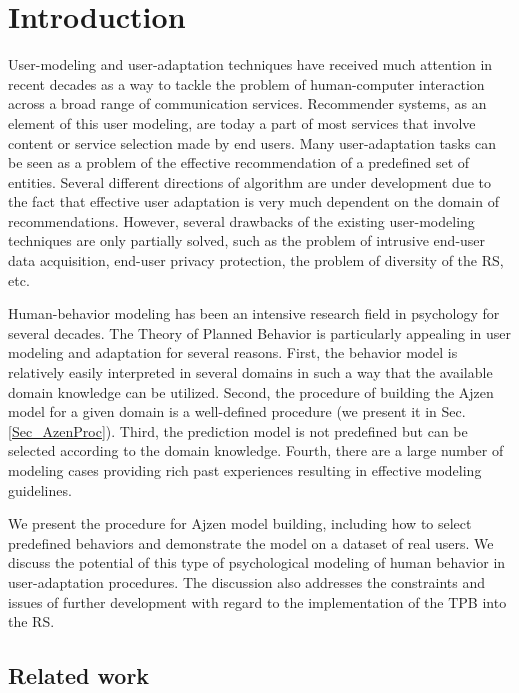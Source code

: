 \documentclass{llncs}
\begin{document}
\section{Introduction}\label{Sec_Intro} 

User-modeling and user-adaptation techniques have received much attention in recent decades as a way to tackle the problem of human-computer interaction across a broad range of communication services. Recommender systems, as an element of this user modeling, are today a part of most services that involve content or service selection made by end users. Many user-adaptation tasks can be seen as a problem of the effective recommendation of a predefined set of entities. Several different directions of algorithm are under development due to the fact that effective user adaptation is very much dependent on the domain of recommendations. However, several drawbacks of the existing user-modeling techniques are only partially solved, such as the problem of intrusive end-user data acquisition, end-user privacy protection, the problem of diversity of the RS, etc.


Human-behavior modeling has been an intensive research field in psychology for several decades. The Theory of Planned Behavior \cite{AjzenWebPage} is particularly appealing in user modeling and adaptation for several reasons. First, the behavior model is relatively easily interpreted in several domains in such a way that the available domain knowledge can be utilized. Second, the procedure of building the Ajzen model for a given domain is a well-defined procedure (we present it in Sec. \ref{Sec_AzenProc}). Third, the prediction model is not predefined but can be selected according to the domain knowledge. Fourth, there are a large number of modeling cases providing rich past experiences resulting in effective modeling guidelines.

We present the procedure for Ajzen model building, including how to select predefined behaviors and demonstrate the model on a dataset of real users. We discuss the potential of this type of psychological modeling of human behavior in user-adaptation procedures. The discussion also addresses the constraints and issues of further development with regard to the implementation of the TPB into the RS.


\subsection{Related work}\label{SubSec_RelatedWork}
\end{document}
